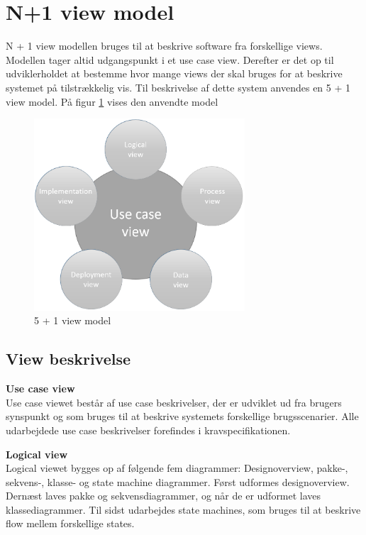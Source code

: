 \section{N+1 view model}

N + 1 view modellen bruges til at beskrive software fra forskellige views. Modellen tager altid udgangspunkt i et use case view. Derefter er det op til udviklerholdet at bestemme hvor mange views der skal bruges for at beskrive systemet på tilstrækkelig vis. Til beskrivelse af dette system anvendes en 5 + 1 view model. På figur \ref{fig:5 + 1 view model} vises den anvendte model


\vspace{-5pt}
\begin{figure}[H]
	\centering
	\includegraphics[width=0.7\textwidth]{Billeder/n+1}
	\vspace{0cm}
	\caption{5 + 1 view model}
	\label{fig:5 + 1 view model}
\end{figure}


\newpage

\subsection{View beskrivelse}

\textbf{Use case view}\\
Use case viewet består af use case beskrivelser, der er udviklet ud fra brugers synspunkt og som bruges til at beskrive systemets forskellige brugsscenarier. Alle udarbejdede use case beskrivelser forefindes i kravspecifikationen.

\textbf{Logical view}\\
Logical viewet bygges op af følgende fem diagrammer: Designoverview, pakke-, sekvens-, klasse- og state machine diagrammer.
Først udformes designoverview. Dernæst laves pakke og sekvensdiagrammer, og når de er udformet laves klassediagrammer. Til sidst udarbejdes state machines, som bruges til at beskrive flow mellem forskellige states.

